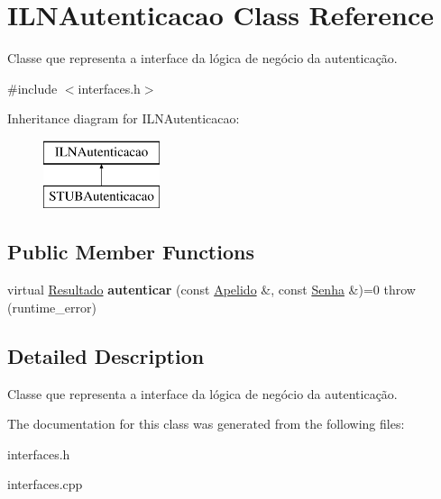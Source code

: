\hypertarget{classILNAutenticacao}{}\section{I\+L\+N\+Autenticacao Class Reference}
\label{classILNAutenticacao}


Classe que representa a interface da lógica de negócio da autenticação.  




{\ttfamily \#include $<$interfaces.\+h$>$}

Inheritance diagram for I\+L\+N\+Autenticacao\+:\begin{figure}[H]
\begin{center}
\leavevmode
\includegraphics[height=2.000000cm]{classILNAutenticacao}
\end{center}
\end{figure}
\subsection*{Public Member Functions}
\begin{DoxyCompactItemize}
\item 
\mbox{\label{classILNAutenticacao_ad14a6619170981ce7cfbabc5d1b38d7d}} 
virtual \hyperlink{classResultado}{Resultado} {\bfseries autenticar} (const \hyperlink{classApelido}{Apelido} \&, const \hyperlink{classSenha}{Senha} \&)=0  throw (runtime\+\_\+error)
\end{DoxyCompactItemize}


\subsection{Detailed Description}
Classe que representa a interface da lógica de negócio da autenticação. 

The documentation for this class was generated from the following files\+:\begin{DoxyCompactItemize}
\item 
interfaces.\+h\item 
interfaces.\+cpp\end{DoxyCompactItemize}
